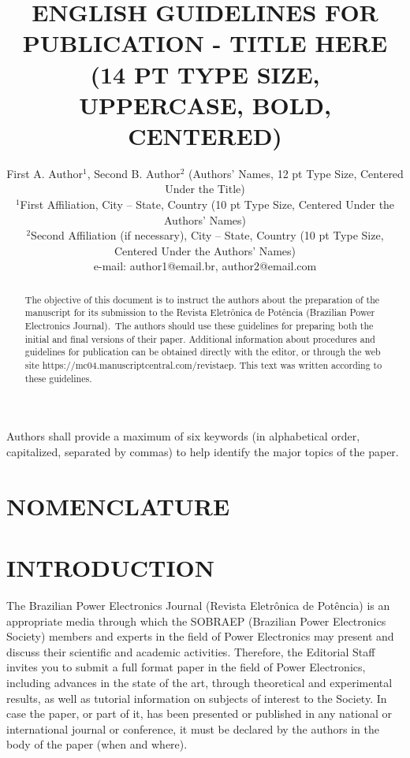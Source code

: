 \documentclass[english]{sobraep}
\title{ENGLISH GUIDELINES FOR PUBLICATION - TITLE HERE \\(14 PT TYPE SIZE, UPPERCASE, BOLD, CENTERED)}
\author{First A. Author$^{1}$, Second B. Author$^{2}$ (Authors' Names, 12 pt Type Size, Centered Under the Title)\\
	\normalsize $^{1}$First Affiliation, City -- State, Country (10 pt Type Size, Centered Under the Authors' Names)\\
	\normalsize $^{2}$Second Affiliation (if necessary), City -- State, Country (10 pt Type Size, Centered Under the Authors' Names)\\
	\normalsize e-mail: author1@email.br, author2@email.com
}
\begin{document}
\maketitle

\begin{abstract}
	The objective of this document is to instruct the authors about the preparation of the manuscript for its submission to the Revista Eletrônica de Potência (Brazilian Power Electronics Journal).~The authors should use these guidelines for preparing both the initial and final versions of their paper. Additional information about procedures and guidelines for publication can be obtained directly with the editor, or through the web site https://mc04.manuscriptcentral.com/revistaep. This text was written according to these guidelines.
\end{abstract}

\begin{keywords}
	Authors shall provide a maximum of six keywords (in alphabetical order, capitalized, separated by commas) to help identify the major topics of the paper.
\end{keywords}

\let\thefootnote\relax{}

\section*{NOMENCLATURE}




\section{INTRODUCTION}

The Brazilian Power Electronics Journal (Revista Eletrônica de Potência) is an appropriate media through which the SOBRAEP (Brazilian Power Electronics Society) members and experts in the field of Power Electronics may present and discuss their scientific and academic activities. Therefore, the Editorial Staff invites you to submit a full format paper in the field of Power Electronics, including advances in the state of the art, through theoretical and experimental results, as well as tutorial information on subjects of interest to the Society. In case the paper, or part of it, has been presented or published in any national or international journal or conference, it must be declared by the authors in the body of the paper (when and where).
\end{document}
